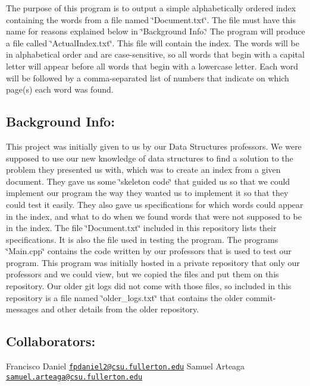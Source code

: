 The purpose of this program is to output a simple alphabetically ordered index containing the words from a file named \char`\"{}\+Document.\+txt\char`\"{}. The file must have this name for reasons explained below in \char`\"{}\+Background Info.\char`\"{} The program will produce a file called \char`\"{}\+Actual\+Index.\+txt\char`\"{}. This file will contain the index. The words will be in alphabetical order and are case-\/sensitive, so all words that begin with a capital letter will appear before all words that begin with a lowercase letter. Each word will be followed by a comma-\/separated list of numbers that indicate on which page(s) each word was found.

\subsection*{Background Info\+:}

This project was initially given to us by our Data Structures professors. We were supposed to use our new knowledge of data structures to find a solution to the problem they presented us with, which was to create an index from a given document. They gave us some \char`\"{}skeleton code\char`\"{} that guided us so that we could implement our program the way they wanted us to implement it so that they could test it easily. They also gave us specifications for which words could appear in the index, and what to do when we found words that were not supposed to be in the index. The file \char`\"{}\+Document.\+txt\char`\"{} included in this repository lists their specifications. It is also the file used in testing the program. The program\textquotesingle{}s \char`\"{}\+Main.\+cpp\char`\"{} contains the code written by our professors that is used to test our program. This program was initially hosted in a private repository that only our professors and we could view, but we copied the files and put them on this repository. Our older git logs did not come with those files, so included in this repository is a file named \char`\"{}older\+\_\+logs.\+txt\char`\"{} that contains the older commit-\/messages and other details from the older repository.

\subsection*{Collaborators\+:}

Francisco Daniel \href{mailto:fpdaniel2@csu.fullerton.edu}{\tt fpdaniel2@csu.\+fullerton.\+edu} Samuel Arteaga \href{mailto:samuel.arteaga@csu.fullerton.edu}{\tt samuel.\+arteaga@csu.\+fullerton.\+edu}

